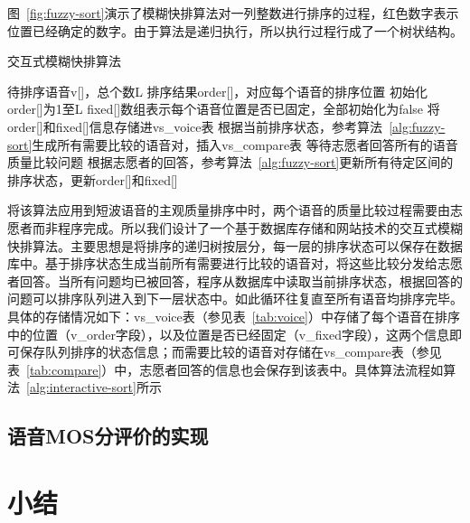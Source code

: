 图~\ref{fig:fuzzy-sort}演示了模糊快排算法对一列整数进行排序的过程，红色数字表示位置已经确定的数字。由于算法是递归执行，所以执行过程行成了一个树状结构。

\begin{algorithm}
    \caption{交互式模糊快排算法}
    \label{alg:interactive-sort}
\begin{algorithmic}[1]
\INPUT
    \Statex 待排序语音v[]，总个数L
\OUTPUT
    \Statex 排序结果order[]，对应每个语音的排序位置
\State 初始化order[]为1至L
\State fixed[]数组表示每个语音位置是否已固定，全部初始化为false
    \State 将order[]和fixed[]信息存储进vs\_voice表
    \State 根据当前排序状态，参考算法~\ref{alg:fuzzy-sort}生成所有需要比较的语音对，插入vs\_compare表
    \State 等待志愿者回答所有的语音质量比较问题
    \State 根据志愿者的回答，参考算法~\ref{alg:fuzzy-sort}更新所有待定区间的排序状态，更新order[]和fixed[]
\EndWhile
\end{algorithmic}
\end{algorithm}

将该算法应用到短波语音的主观质量排序中时，两个语音的质量比较过程需要由志愿者而非程序完成。所以我们设计了一个基于数据库存储和网站技术的交互式模糊快排算法。主要思想是将排序的递归树按层分，每一层的排序状态可以保存在数据库中。基于排序状态生成当前所有需要进行比较的语音对，将这些比较分发给志愿者回答。当所有问题均已被回答，程序从数据库中读取当前排序状态，根据回答的问题可以排序队列进入到下一层状态中。如此循环往复直至所有语音均排序完毕。具体的存储情况如下：vs\_voice表（参见表~\ref{tab:voice}）中存储了每个语音在排序中的位置（v\_order字段），以及位置是否已经固定（v\_fixed字段），这两个信息即可保存队列排序的状态信息；而需要比较的语音对存储在vs\_compare表（参见表~\ref{tab:compare}）中，志愿者回答的信息也会保存到该表中。具体算法流程如算法~\ref{alg:interactive-sort}所示

\subsection{语音MOS分评价的实现}

\section{小结}

